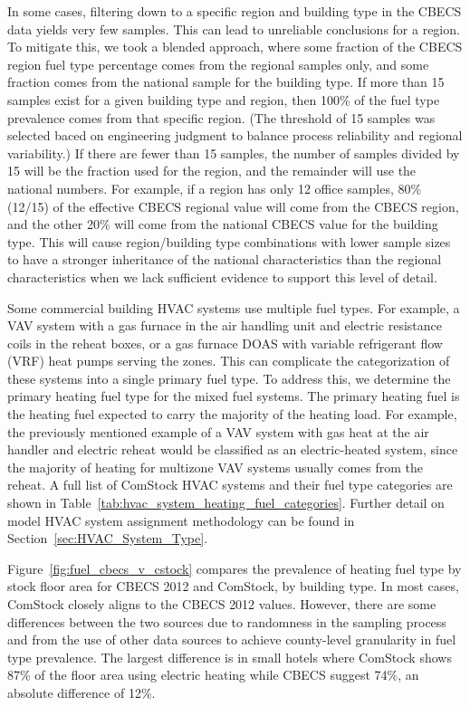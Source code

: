 In some cases, filtering down to a specific region and building type in the CBECS data yields very few samples. This can lead to unreliable conclusions for a region. To mitigate this, we took a blended approach, where some fraction of the CBECS region fuel type percentage comes from the regional samples only, and some fraction comes from the national sample for the building type. If more than 15 samples exist for a given building type and region, then 100\% of the fuel type prevalence comes from that specific region. (The threshold of 15 samples was selected baced on engineering judgment to balance process reliability and regional variability.) If there are fewer than 15 samples, the number of samples divided by 15 will be the fraction used for the region, and the remainder will use the national numbers. For example, if a region has only 12 office samples, 80\% (12\//15) of the effective CBECS regional value will come from the CBECS region, and the other 20\% will come from the national CBECS value for the building type. This will cause region/building type combinations with lower sample sizes to have a stronger inheritance of the national characteristics than the regional characteristics when we lack sufficient evidence to support this level of detail.

Some commercial building HVAC systems use multiple fuel types. For example, a VAV system with a gas furnace in the air handling unit and electric resistance coils in the reheat boxes, or a gas furnace DOAS with variable refrigerant flow (VRF) heat pumps serving the zones. This can complicate the categorization of these systems into a single primary fuel type. To address this, we determine the primary heating fuel type for the mixed fuel systems. The primary heating fuel is the heating fuel expected to carry the majority of the heating load. For example, the previously mentioned example of a VAV system with gas heat at the air handler and electric reheat would be classified as an electric-heated system, since the majority of heating for multizone VAV systems usually comes from the reheat. A full list of ComStock HVAC systems and their fuel type categories are shown in Table~\ref{tab:hvac_system_heating_fuel_categories}. Further detail on model HVAC system assignment methodology can be found in Section~\ref{sec:HVAC_System_Type}.

Figure~\ref{fig:fuel_cbecs_v_cstock} compares the prevalence of heating fuel type by stock floor area for CBECS 2012 and ComStock, by building type. In most cases, ComStock closely aligns to the CBECS 2012 values. However, there are some differences between the two sources due to randomness in the sampling process and from the use of other data sources to achieve county-level granularity in fuel type prevalence. The largest difference is in small hotels where ComStock shows 87\% of the floor area using electric heating while CBECS suggest 74\%, an absolute difference of 12\%.

